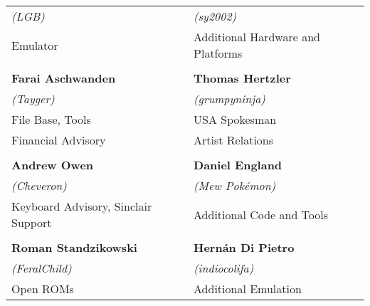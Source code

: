 \begin{tabular}{ll}
 \textit{(LGB)}                         & \textit{(sy2002)} \\
Emulator                                & Additional Hardware and Platforms \\
& \\
{\large\bf Farai Aschwanden}            & {\large\bf Thomas Hertzler} \\
 \textit{(Tayger)}                      & \textit{(grumpyninja)} \\
File Base, Tools                        & USA Spokesman \\
Financial Advisory                      & Artist Relations \\
& \\
{\large\bf Andrew Owen}                 & {\large\bf Daniel England} \\
 \textit{(Cheveron)}                    & \textit{(Mew Pokémon)} \\
Keyboard Advisory, Sinclair Support     & Additional Code and Tools \\
& \\
{\large\bf Roman Standzikowski}         & {\large\bf Hernán Di Pietro} \\
 \textit{(FeralChild)}                  & \textit{(indiocolifa)} \\
Open ROMs                               & Additional Emulation \\
\end{tabular}

